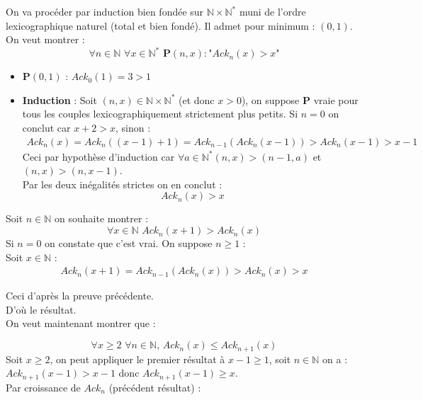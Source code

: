\documentclass[12pt,letterpaper,boxed]{hmcpset}
\newcommand{\property}{\mathbf{P}}
\begin{document}
\begin{solution}

\begin{solution}[(a)]
On va procéder par induction bien fondée sur $\mathbb{N} \times \mathbb{N}^{*}$ muni de l'ordre lexicographique naturel (total et bien fondé). Il admet pour minimum : $(0,1)$. \\
On veut montrer : $$\forall n \in \mathbb{N} \, \, \forall x \in \mathbb{N}^{*} \, \, \property(n,x) : \text{"}Ack_{n}(x) > x\text{"}$$

\begin{itemize}
\item 
$\property(0,1)$ : $Ack_{0}(1) = 3 > 1$

\item \textbf{Induction} : Soit $(n,x) \in \mathbb{N} \times \mathbb{N}^{*}$ (et donc $x > 0$), on suppose $\property$ vraie pour tous les couples lexicographiquement strictement plus petits. Si $n = 0$ on conclut car $x+2 > x$, sinon :
\begin{align*}
	Ack_{n}(x) = Ack_{n}((x-1)+1) = Ack_{n-1}(Ack_{n}(x-1)) > Ack_{n}(x-1) > x-1
\end{align*}
Ceci par hypothèse d'induction car $\forall a \in \mathbb{N}^{*} (n,x) > (n-1,a)$ et $(n,x) > (n, x-1)$. \\
Par les deux inégalités strictes on en conclut : 
$$ Ack_{n}(x) > x$$

\end{itemize}

\noindent Soit $n \in \mathbb{N}$ on souhaite montrer : $$\forall x \in \mathbb{N} \, \, Ack_{n}(x+1) > Ack_{n}(x)$$
Si $n = 0$ on constate que c'est vrai. On suppose $n \geq 1$ : \\
Soit $x \in \mathbb{N}$ : 
\begin{align*}
Ack_{n}(x+1) = Ack_{n-1}(Ack_{n}(x)) > Ack_{n}(x) > x
\end{align*}

\noindent Ceci d'après la preuve précédente.\\
D'où le résultat. \\
On veut maintenant montrer que : 

$$ \forall x \geq 2 \, \, \forall n \in \mathbb{N}, \, Ack_{n}(x) \leq Ack_{n+1}(x) $$
Soit $ x \geq 2$, on peut appliquer le premier résultat à $x-1 \geq 1$, soit $n \in \mathbb{N}$ on a :
\\
$Ack_{n+1}(x-1) > x - 1$ donc 
$Ack_{n+1}(x-1) \geq x$. \\
Par croissance de $Ack_{n}$ (précédent résultat) : 


\end{solution}
\end{solution}
\end{document}
